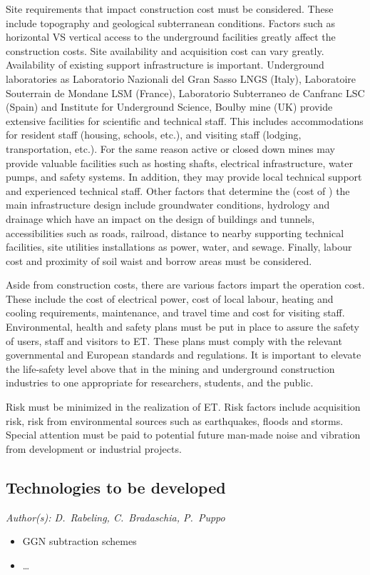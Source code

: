 Site requirements that impact construction cost must be considered. These include topography and geological 
subterranean conditions. Factors such as horizontal VS vertical access to the underground facilities greatly 
affect the construction costs. Site availability and acquisition cost can vary greatly. Availability of existing 
support infrastructure is important. Underground laboratories as Laboratorio Nazionali del Gran Sasso LNGS 
(Italy), Laboratoire Souterrain de Mondane LSM (France), Laboratorio Subterraneo de Canfranc LSC (Spain) 
and Institute for Underground Science, Boulby mine (UK) provide extensive facilities for scientific and technical 
staff. This includes accommodations for resident staff (housing, schools, etc.), and visiting staff (lodging, 
transportation, etc.). For the same reason active or closed down mines may provide valuable facilities such 
as hosting shafts, electrical infrastructure, water pumps, and safety systems. In addition, they may provide 
local technical support and experienced technical staff. Other factors that determine the (cost of ) the main 
infrastructure design include groundwater conditions, hydrology and drainage which have an impact on the 
design of buildings and tunnels, accessibilities such as roads, railroad, distance to nearby supporting technical 
facilities, site utilities installations as power, water, and sewage. Finally, labour cost and proximity of soil waist 
and borrow areas must be considered. 

Aside from construction costs, there are various factors impart the operation cost. These include the cost of
electrical power, cost of local labour, heating and cooling requirements, maintenance, and travel time and 
cost for visiting staff. Environmental, health and safety plans must be put in place to assure the safety of
users, staff and visitors to ET. These plans must comply with the relevant governmental and European
standards and regulations. It is important to elevate the life-safety level above that in the mining and
underground construction industries to one appropriate for researchers, students, and the public. 

Risk must be minimized in the realization of ET. Risk factors include acquisition risk, risk from environmental 
sources such as earthquakes, floods and storms. Special attention must be paid to potential future man-made 
noise and vibration from development or industrial projects. 
\FloatBarrier
\subsection{Technologies to be developed}
\emph{
Author(s): D.\ Rabeling, C.\ Bradaschia, P.\ Puppo
}
\begin{itemize}
\item GGN subtraction schemes





\item \dots
\end{itemize}

